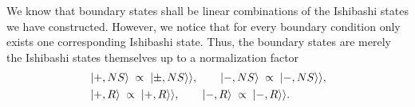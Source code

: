 We know that boundary states shall be linear combinations of the Ishibashi states we have constructed. However, we notice that for every boundary condition only exists one corresponding Ishibashi state. Thus, the boundary states are merely the Ishibashi states themselves up to a normalization factor
\begin{align}
  &\ket{+,NS} \;\propto\;  |\pm,NS\rangle\rangle, \qquad \ket{-,NS} \;\propto\;  |-,NS\rangle\rangle, \\
  &\ket{+,R} \;\propto\;  |+,R\rangle\rangle, \qquad \ket{-,R} \;\propto\;  |-,R\rangle\rangle.
\end{align}
